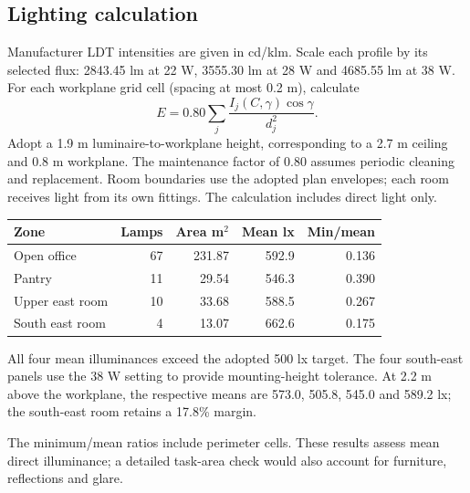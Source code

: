 \subsection*{Lighting calculation}
Manufacturer LDT intensities are given in cd/klm. Scale each profile by its selected flux: 2843.45 lm at 22 W, 3555.30 lm at 28 W and 4685.55 lm at 38 W. For each workplane grid cell (spacing at most 0.2 m), calculate
\[
E=0.80\sum_j\frac{I_j(C,\gamma)\cos\gamma}{d_j^2}.
\]
Adopt a 1.9 m luminaire-to-workplane height, corresponding to a 2.7 m ceiling and 0.8 m workplane. The maintenance factor of 0.80 assumes periodic cleaning and replacement. Room boundaries use the adopted plan envelopes; each room receives light from its own fittings. The calculation includes direct light only.
\begin{center}\begin{tabular}{lrrrr}\toprule
Zone & Lamps & Area m$^2$ & Mean lx & Min/mean\\\midrule
Open office & 67 & 231.87 & 592.9 & 0.136\\
Pantry & 11 & 29.54 & 546.3 & 0.390\\
Upper east room & 10 & 33.68 & 588.5 & 0.267\\
South east room & 4 & 13.07 & 662.6 & 0.175\\
\bottomrule\end{tabular}\end{center}
All four mean illuminances exceed the adopted 500 lx target. The four south-east panels use the 38 W setting to provide mounting-height tolerance. At 2.2 m above the workplane, the respective means are 573.0, 505.8, 545.0 and 589.2 lx; the south-east room retains a 17.8\% margin.

The minimum/mean ratios include perimeter cells. These results assess mean direct illuminance; a detailed task-area check would also account for furniture, reflections and glare.
